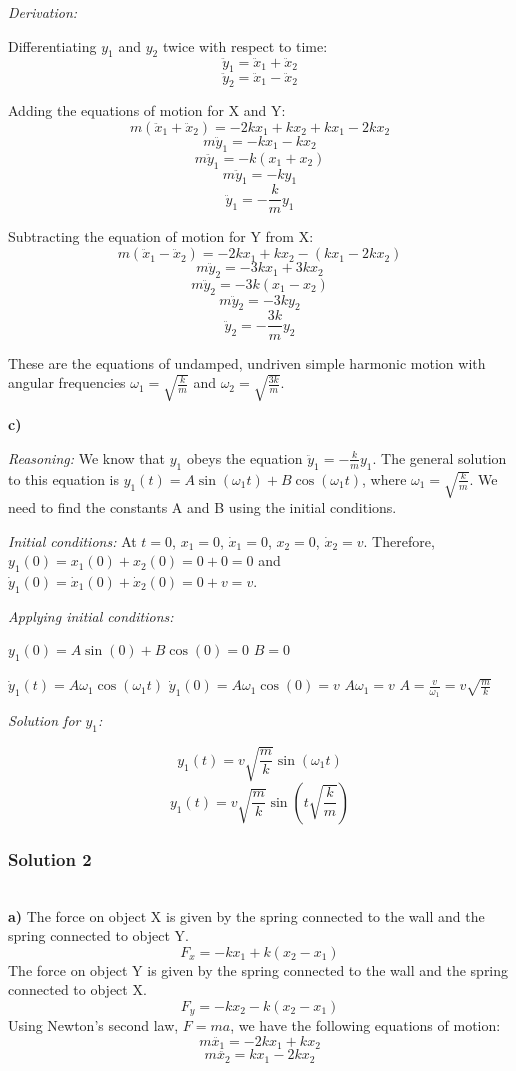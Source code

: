 \documentclass{article}
\begin{document}
\textit{Derivation:}

Differentiating $y_1$ and $y_2$ twice with respect to time:
\[ \ddot{y}_1 = \ddot{x}_1 + \ddot{x}_2 \]
\[ \ddot{y}_2 = \ddot{x}_1 - \ddot{x}_2 \]

Adding the equations of motion for X and Y:
\[ m(\ddot{x}_1 + \ddot{x}_2) = -2kx_1 + kx_2 + kx_1 - 2kx_2 \]
\[ m\ddot{y}_1 = -kx_1 - kx_2 \]
\[ m\ddot{y}_1 = -k(x_1 + x_2) \]
\[ m\ddot{y}_1 = -ky_1 \]
\[ \ddot{y}_1 = -\frac{k}{m}y_1 \]

Subtracting the equation of motion for Y from X:
\[ m(\ddot{x}_1 - \ddot{x}_2) = -2kx_1 + kx_2 - (kx_1 - 2kx_2) \]
\[ m\ddot{y}_2 = -3kx_1 + 3kx_2 \]
\[ m\ddot{y}_2 = -3k(x_1 - x_2) \]
\[ m\ddot{y}_2 = -3ky_2 \]
\[ \ddot{y}_2 = -\frac{3k}{m}y_2 \]

These are the equations of undamped, undriven simple harmonic motion with angular frequencies $\omega_1 = \sqrt{\frac{k}{m}}$ and $\omega_2 = \sqrt{\frac{3k}{m}}$.

\textbf{c)}

\textit{Reasoning:}
We know that $y_1$ obeys the equation $\ddot{y}_1 = -\frac{k}{m}y_1$. The general solution to this equation is $y_1(t) = A\sin(\omega_1 t) + B\cos(\omega_1 t)$, where $\omega_1 = \sqrt{\frac{k}{m}}$. We need to find the constants A and B using the initial conditions.

\textit{Initial conditions:}
At $t=0$, $x_1 = 0$, $\dot{x}_1 = 0$, $x_2 = 0$, $\dot{x}_2 = v$.
Therefore, $y_1(0) = x_1(0) + x_2(0) = 0 + 0 = 0$ and $\dot{y}_1(0) = \dot{x}_1(0) + \dot{x}_2(0) = 0 + v = v$.

\textit{Applying initial conditions:}

$y_1(0) = A\sin(0) + B\cos(0) = 0$
$B = 0$

$\dot{y}_1(t) = A\omega_1\cos(\omega_1 t)$
$\dot{y}_1(0) = A\omega_1\cos(0) = v$
$A\omega_1 = v$
$A = \frac{v}{\omega_1} = v\sqrt{\frac{m}{k}}$

\textit{Solution for $y_1$:}

\[ y_1(t) = v\sqrt{\frac{m}{k}}\sin(\omega_1 t) \]
\[ y_1(t) = v\sqrt{\frac{m}{k}}\sin(t\sqrt{\frac{k}{m}}) \]



\subsubsection{Solution 2}
\\
\textbf{a)}
The force on object X is given by the spring connected to the wall and the spring connected to object Y.
\begin{equation}
F_x = -kx_1 + k(x_2 - x_1)
\end{equation}
The force on object Y is given by the spring connected to the wall and the spring connected to object X.
\begin{equation}
F_y = -kx_2 - k(x_2 - x_1)
\end{equation}
Using Newton's second law, $F = ma$, we have the following equations of motion:
\begin{equation}
m\ddot{x_1} = -2kx_1 + kx_2
\end{equation}
\begin{equation}
m\ddot{x_2} = kx_1 - 2kx_2
\end{equation}
\end{document}
